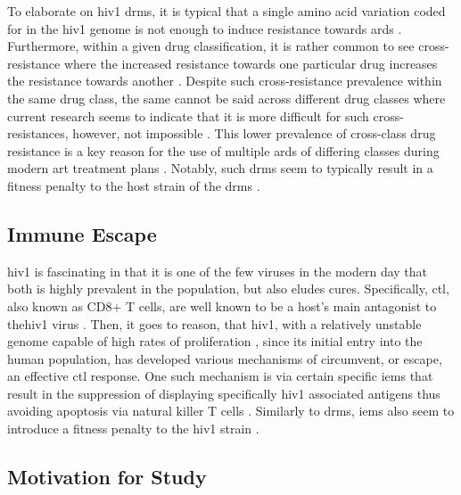To elaborate on \ac{hiv1} \acp{drm}, it is typical that a single amino acid variation coded for in the \ac{hiv1} genome is not enough to induce resistance towards \acp{ard} \cite{clutterHIV1DrugResistance2016}. Furthermore, within a given drug classification, it is rather common to see cross-resistance where the increased resistance towards one particular drug increases the resistance towards another \cite{clutterHIV1DrugResistance2016}. Despite such cross-resistance prevalence within the same drug class, the same cannot be said across different drug classes where current research seems to indicate that it is more difficult \cite{larderInteractionsDrugResistance1994} for such cross-resistances, however, not impossible \cite{clutterHIV1DrugResistance2016,lombardiPrevalenceFactorsAssociated2021,segal-maurerCapsidInhibitionLenacapavir2022}. This lower prevalence of cross-class drug resistance is a key reason for the use of multiple \acp{ard} of differing classes during modern \ac{art} treatment plans \cite{gibasTwodrugRegimensHIV2022}. Notably, such \acp{drm} seem to typically result in a fitness penalty to the host strain of the \acp{drm} \cite{clutterHIV1DrugResistance2016}.

\subsection{Immune Escape}

\Ac{hiv1} is fascinating in that it is one of the few viruses in the modern day that both is highly prevalent in the population, but also eludes cures. Specifically, \ac{ctl}, also known as CD8+ T cells, are well known to be a host's main antagonist to the\ac{hiv1} virus \cite{garciaEffectInterferenceCD82015}. Then, it goes to reason, that \ac{hiv1}, with a relatively unstable genome capable of high rates of proliferation \cite{richmanHIVEvolutionEscape2004}, since its initial entry into the human population, has developed various mechanisms of circumvent, or escape, an effective \ac{ctl} response. One such mechanism is via certain specific \acp{iem} that result in the suppression of displaying specifically \ac{hiv1} associated antigens thus avoiding apoptosis via natural killer T cells \cite{varela-rohenaControlHIV1Immune2008}. Similarly to \acp{drm}, \acp{iem} also seem to introduce a fitness penalty to the \ac{hiv1} strain \cite{woodmanHIVMolecularEpidemiology2009,leslieHIVEvolutionCTL2004}.

\subsection{Motivation for Study}

